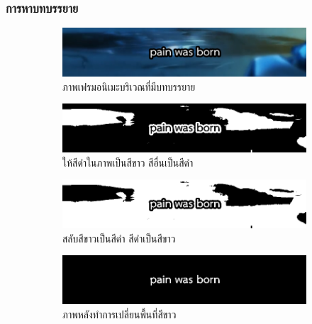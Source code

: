 \documentclass[xcolor=dvipsnames, xetex,serif]{beamer}
\numberwithin{equation}{section}
\begin{document}
    \begin{frame}
        \frametitle{การหาบทบรรยาย}
        \begin{figure}[H]
            \begin{subfigure}{0.4\linewidth}
                \centering
                \includegraphics[width=0.8\linewidth]{images/subtitle_detection/detection-original.png}
                \caption{ภาพเฟรมอนิเมะบริเวณที่มีบทบรรยาย}
            \end{subfigure}
            \begin{subfigure}{0.4\linewidth}
                \centering
                \includegraphics[width=0.8\linewidth]{images/subtitle_detection/detection-threshold.png}
                \caption{ให้สีดำในภาพเป็นสีขาว สีอื่นเป็นสีดำ }
            \end{subfigure}
            \begin{subfigure}{0.4\linewidth}
                \centering
                \includegraphics[width=0.8\linewidth]{images/subtitle_detection/detection-inverse.png}
                \caption{สลับสีขาวเป็นสีดำ สีดำเป็นสีขาว}
            \end{subfigure}
            \begin{subfigure}{0.4\linewidth}
                \centering
                \includegraphics[width=0.8\linewidth]{images/subtitle_detection/detection-blackfill.png}
                \caption{ภาพหลังทำการเปลี่ยนพื้นที่สีขาว}
            \end{subfigure}
            \begin{subfigure}{0.4\linewidth}

\end{subfigure}
\end{figure}
\end{frame}
\end{document}
